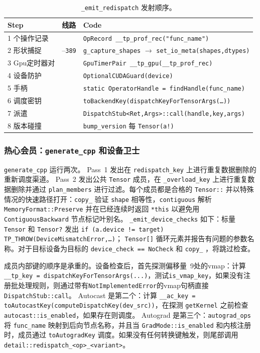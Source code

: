 \begin{table}[H]
\centering
\caption{\texttt{\_emit\_redispatch} 发射顺序。}
\label{tab:emitredispatch}
\small
\begin{tabular}{lll}
\toprule
Step & 线路 & Code \\
\midrule
1 个操作记录 &  & \texttt{OpRecord \_\_tp\_prof\_rec("func\_name")} \\
2 形状捕捉 & --\texttt{389} & \texttt{g\_capture\_shapes} $\rightarrow$ \texttt{set\_io\_meta(shapes,dtypes)} \\
3 Gpu定时器对 &  & \texttt{GpuTimerPair \_\_tp\_gpu(\_\_tp\_prof\_rec)} \\
4 设备防护 &  & \texttt{OptionalCUDAGuard(device)} \\
5 手柄 &  & \texttt{static OperatorHandle = findHandle(func\_name)} \\
6 调度密钥 &  & \texttt{toBackendKey(dispatchKeyForTensorArgs(\dots))} \\
7 派遣 &  & \texttt{DispatchStub<Ret,Args>::call(handle,key,args)} \\
8 版本碰撞 &  & \texttt{bump\_version} 每 \texttt{Tensor(a!)} \\
\bottomrule
\end{tabular}
\end{table}

\subsubsection{热心会员：\texttt{generate\_cpp} 和设备卫士}

\texttt{generate\_cpp} 运行两次。 Pass~1 发出在 \texttt{redispatch\_key} 上进行重复数据删除的重新调度渠道。 Pass~2 发出公共 \texttt{Tensor} 成员，在 \texttt{\_overload\_key} 上进行重复数据删除并通过 \texttt{plan\_members} 进行过滤。每个成员都是合格的 \texttt{Tensor::} 并以特殊情况的快速路径打开：\texttt{copy\_} 验证 \texttt{shape} 相等性，\texttt{contiguous} 解析 \texttt{MemoryFormat::Preserve} 并在已经连续时返回 \texttt{*this} 以避免用 \texttt{ContiguousBackward} 节点标记叶别名。 \texttt{\_emit\_device\_checks} 如下：标量 \texttt{Tensor} 和 \texttt{Tensor?} 发出 \texttt{if (a.device != target) TP\_THROW(DeviceMismatchError,\dots)}； \texttt{Tensor[]} 循环元素并报告有问题的参数名称。对于目标设备为目标的 \texttt{device\_check == NoCheck} 和 \texttt{copy\_} ，将跳过检查。

成员内部键的顺序是承重的。设备检查后，首先探测偏移量~9处的vmap：计算\texttt{\_\_tp\_key = dispatchKeyForTensorArgs(...)}，测试\texttt{is\_vmap\_key}，如果没有注册批处理规则，则通过带有\texttt{NotImplementedError}的vmap句柄直接\texttt{DispatchStub::call}。 Autocast 是第二个：计算 \texttt{\_\_ac\_key = toAutocastKey(computeDispatchKey(dev\_src))}，在探测 \texttt{getKernel} 之前检查 \texttt{autocast::is\_enabled}，如果存在则调度。 Autograd 是第三个：\texttt{autograd\_ops} 将 \texttt{func\_name} 映射到后向节点名称，并且当 \texttt{GradMode::is\_enabled} 和内核注册时，成员通过 \texttt{toAutogradKey} 调度。如果没有任何转换键触发，则尾部调用 \texttt{detail::redispatch\_<op>\_<variant>}。

